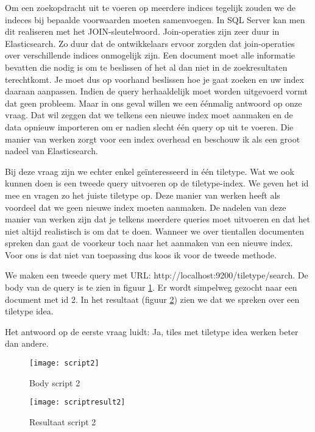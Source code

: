Om een zoekopdracht uit te voeren op meerdere indices tegelijk zouden we de indeces bij bepaalde voorwaarden moeten samenvoegen. In SQL Server kan men dit realiseren met het JOIN-sleutelwoord. Join-operaties zijn zeer duur in Elasticsearch. Zo duur dat de ontwikkelaars ervoor zorgden dat join-operaties over verschillende indices onmogelijk zijn. Een document moet alle informatie bevatten die nodig is om te beslissen of het al dan niet in de zoekresultaten terechtkomt. Je moet dus op voorhand beslissen hoe je gaat zoeken en uw index daaraan aanpassen. Indien de query herhaaldelijk moet worden uitgevoerd vormt dat geen probleem. Maar in ons geval willen we een éénmalig antwoord op onze vraag. Dat wil zeggen dat we telkens een nieuwe index moet aanmaken en de data opnieuw importeren om er nadien slecht één query op uit te voeren. Die manier van werken zorgt voor een index overhead en beschouw ik als een groot nadeel van Elasticsearch.

Bij deze vraag zijn we echter enkel geïnteresseerd in één tiletype. Wat we ook kunnen doen is een tweede query uitvoeren op de tiletype-index. We geven het id mee en vragen zo het juiste tiletype op. Deze manier van werken heeft als voordeel dat we geen nieuwe index moeten aanmaken. De nadelen van deze manier van werken zijn dat je telkens meerdere queries moet uitvoeren en dat het niet altijd realistisch is om dat te doen. Wanneer we over tientallen documenten spreken dan gaat de voorkeur toch naar het aanmaken van een nieuwe index. Voor ons is dat niet van toepassing dus koos ik voor de tweede methode.

We maken een tweede query met URL: http://localhost:9200/tiletype/\textunderscore search. De body van de query is te zien in figuur \ref{fig:script2}. Er wordt simpelweg gezocht naar een document met id 2. In het resultaat (figuur \ref{fig:scriptresult2}) zien we dat we spreken over een tiletype idea.

Het antwoord op de eerste vraag luidt: Ja, tiles met tiletype idea werken beter dan andere.

\begin{figure}
	\centering
	\texttt{[image: script2]}
	\caption{Body script 2}
	\label{fig:script2}
\end{figure}

\begin{figure}
	\centering
	\texttt{[image: scriptresult2]}
	\caption{Resultaat script 2}
	\label{fig:scriptresult2}
\end{figure}

